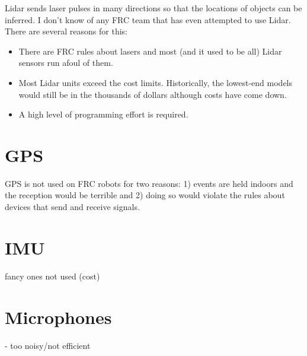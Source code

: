\documentclass{article}
\begin{document}
Lidar sends laser pulses in many directions so that the locations of objects can be inferred.  I don't know of any FRC team that has even attempted to use Lidar.  There are several reasons for this:
\begin{itemize}
\item There are FRC rules about lasers and most (and it used to be all) Lidar sensors run afoul of them.  
\item Most Lidar units exceed the cost limits.  Historically, the lowest-end models would still be in the thousands of dollars although costs have come down.  
\item A high level of programming effort is required.  
\end{itemize}



\section{GPS}
GPS is not used on FRC robots for two reasons: 1) events are held indoors and the reception would be terrible and 2) doing so would violate the rules about devices that send and receive signals.

\section{IMU}
fancy ones not used (cost)
\section{Microphones}
- too noisy/not efficient
\end{document}
